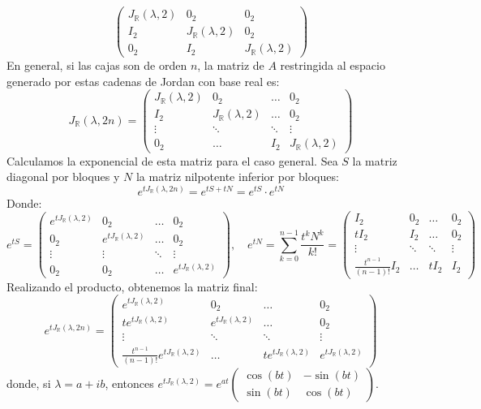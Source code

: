 {    \[
        \begin{pmatrix}
            J_{\mathbb{R}}(\lambda, 2) & 0_2 & 0_2 \\
            I_2 & J_{\mathbb{R}}(\lambda, 2) & 0_2 \\
            0_2 & I_2 & J_{\mathbb{R}}(\lambda, 2) 
        \end{pmatrix}  
    \]
    En general, si las cajas son de orden $n$, la matriz de $A$ restringida al espacio generado por estas cadenas de Jordan con base real es:
    \[
        J_{\mathbb{R}}(\lambda, 2n) = \begin{pmatrix}
            J_{\mathbb{R}}(\lambda, 2) & 0_2 & \dots & 0_2 \\
            I_2 & J_{\mathbb{R}}(\lambda, 2) & \dots & 0_2 \\
            \vdots & \ddots & \ddots & \vdots \\
            0_2 & \dots & I_2 & J_{\mathbb{R}}(\lambda, 2)
        \end{pmatrix}
    \]
    Calculamos la exponencial de esta matriz para el caso general. Sea $S$ la matriz diagonal por bloques y $N$ la matriz nilpotente inferior por bloques:
    \[
        e^{t J_{\mathbb{R}}(\lambda, 2n)} = e^{t S + t N} = e^{t S} \cdot e^{t N}
    \]
    Donde:
    \[
        e^{t S} = \begin{pmatrix}
            e^{t J_{\mathbb{R}}(\lambda, 2)} & 0_2 & \dots & 0_2 \\
            0_2 & e^{t J_{\mathbb{R}}(\lambda, 2)} & \dots & 0_2 \\
            \vdots & \vdots & \ddots & \vdots \\
            0_2 & 0_2 & \dots & e^{t J_{\mathbb{R}}(\lambda, 2)}
        \end{pmatrix}, \quad 
        e^{t N} = \sum_{k=0}^{n-1} \frac{t^k N^k}{k!} = \begin{pmatrix}
            I_2 & 0_2 & \dots & 0_2 \\
            t I_2 & I_2 & \dots & 0_2 \\
            \vdots & \ddots & \ddots & \vdots \\
            \frac{t^{n-1}}{(n-1)!} I_2 & \dots & t I_2 & I_2
        \end{pmatrix}
    \]
    Realizando el producto, obtenemos la matriz final:
    \[
        e^{t J_{\mathbb{R}}(\lambda, 2n)} = \begin{pmatrix}
            e^{t J_{\mathbb{R}}(\lambda, 2)} & 0_2 & \dots & 0_2 \\
            t e^{t J_{\mathbb{R}}(\lambda, 2)} & e^{t J_{\mathbb{R}}(\lambda, 2)} & \dots & 0_2 \\
            \vdots & \ddots & \ddots & \vdots \\
            \frac{t^{n-1}}{(n-1)!} e^{t J_{\mathbb{R}}(\lambda, 2)} & \dots & t e^{t J_{\mathbb{R}}(\lambda, 2)} & e^{t J_{\mathbb{R}}(\lambda, 2)}
        \end{pmatrix}
    \]
    donde, si $\lambda = a + ib$, entonces $e^{t J_{\mathbb{R}}(\lambda, 2)} = e^{at} \begin{pmatrix} \cos(bt) & -\sin(bt) \\ \sin(bt) & \cos(bt) \end{pmatrix}$.
}

